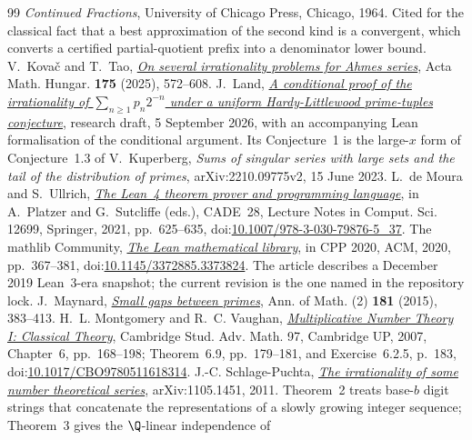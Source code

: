 \documentclass[11pt]{article}
\begin{document}
\begin{thebibliography}{99}
  \emph{Continued Fractions}, University of Chicago Press, Chicago, 1964.
  Cited for the classical fact that a best approximation of the second kind is
  a convergent, which converts a certified partial-quotient prefix into a
  denominator lower bound.
 V.~Kova\v{c} and T.~Tao,
  \href{https://doi.org/10.1007/s10474-025-01528-0}{\emph{On several
  irrationality problems for Ahmes series}}, Acta Math. Hungar. \textbf{175}
  (2025), 572--608.
 J.~Land,
  \href{https://github.com/beetree/math_erdos_251}{\emph{A conditional proof of
  the irrationality of $\sum_{n\ge1}p_n2^{-n}$ under a uniform
  Hardy-Littlewood prime-tuples conjecture}}, research draft, 5 September 2026,
  with an accompanying Lean formalisation of the conditional argument.  Its
  Conjecture~1 is the large-$x$ form of Conjecture~1.3 of V.~Kuperberg,
  \emph{Sums of singular series with large sets and the tail of the
  distribution of primes}, arXiv:2210.09775v2, 15 June 2023.
 L.~de Moura and S.~Ullrich,
  \href{https://doi.org/10.1007/978-3-030-79876-5_37}
  {\emph{The Lean~4 theorem prover and programming language}},
  in A.~Platzer and G.~Sutcliffe (eds.), CADE~28,
  Lecture Notes in Comput. Sci. 12699, Springer, 2021, pp.~625--635,
  doi:\href{https://doi.org/10.1007/978-3-030-79876-5_37}
  {10.1007/978-3-030-79876-5\_37}.
 The mathlib Community,
  \href{https://doi.org/10.1145/3372885.3373824}
  {\emph{The Lean mathematical library}},
  in CPP 2020, ACM, 2020, pp.~367--381,
  doi:\href{https://doi.org/10.1145/3372885.3373824}
  {10.1145/3372885.3373824}.  The article describes a December 2019
  Lean~3-era snapshot; the current revision is the one named in the repository
  lock.
 J.~Maynard,
  \href{https://doi.org/10.4007/annals.2015.181.1.7}
  {\emph{Small gaps between primes}},
  Ann. of Math. (2) \textbf{181} (2015), 383--413.
 H.~L. Montgomery and R.~C. Vaughan,
  \href{https://doi.org/10.1017/CBO9780511618314}
  {\emph{Multiplicative Number Theory I: Classical Theory}},
  Cambridge Stud. Adv. Math. 97, Cambridge UP, 2007,
  Chapter~6, pp.~168--198; Theorem~6.9, pp.~179--181, and
  Exercise~6.2.5, p.~183,
  doi:\href{https://doi.org/10.1017/CBO9780511618314}
  {10.1017/CBO9780511618314}.
 J.-C. Schlage-Puchta,
  \href{https://arxiv.org/abs/1105.1451}{\emph{The irrationality of some number
  theoretical series}}, arXiv:1105.1451, 2011.  Theorem~2 treats base-$b$
  digit strings that concatenate the representations of a slowly growing
  integer sequence; Theorem~3 gives the $\Q$-linear independence of

\end{thebibliography}
\end{document}

